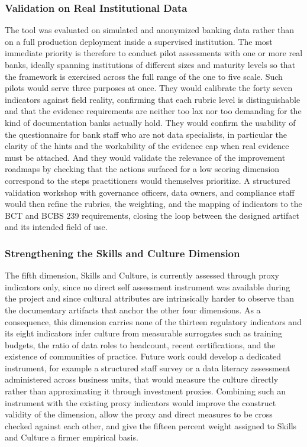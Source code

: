 \subsubsection{Validation on Real Institutional Data}

The tool was evaluated on simulated and anonymized banking data rather than on a full production deployment inside a supervised institution. The most immediate priority is therefore to conduct pilot assessments with one or more real banks, ideally spanning institutions of different sizes and maturity levels so that the framework is exercised across the full range of the one to five scale. Such pilots would serve three purposes at once. They would calibrate the forty seven indicators against field reality, confirming that each rubric level is distinguishable and that the evidence requirements are neither too lax nor too demanding for the kind of documentation banks actually hold. They would confirm the usability of the questionnaire for bank staff who are not data specialists, in particular the clarity of the hints and the workability of the evidence cap when real evidence must be attached. And they would validate the relevance of the improvement roadmaps by checking that the actions surfaced for a low scoring dimension correspond to the steps practitioners would themselves prioritize. A structured validation workshop with governance officers, data owners, and compliance staff would then refine the rubrics, the weighting, and the mapping of indicators to the BCT and BCBS 239 requirements, closing the loop between the designed artifact and its intended field of use.

\subsubsection{Strengthening the Skills and Culture Dimension}

The fifth dimension, Skills and Culture, is currently assessed through proxy indicators only, since no direct self assessment instrument was available during the project and since cultural attributes are intrinsically harder to observe than the documentary artifacts that anchor the other four dimensions. As a consequence, this dimension carries none of the thirteen regulatory indicators and its eight indicators infer culture from measurable surrogates such as training budgets, the ratio of data roles to headcount, recent certifications, and the existence of communities of practice. Future work could develop a dedicated instrument, for example a structured staff survey or a data literacy assessment administered across business units, that would measure the culture directly rather than approximating it through investment proxies. Combining such an instrument with the existing proxy indicators would improve the construct validity of the dimension, allow the proxy and direct measures to be cross checked against each other, and give the fifteen percent weight assigned to Skills and Culture a firmer empirical basis.

